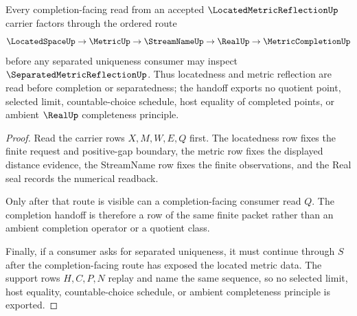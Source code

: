 \begin{theorem}
\label{thm:located-metric-reflection-completion-handoff}
Every completion-facing read from an accepted $\LocatedMetricReflectionUp$ carrier factors through the ordered route
$$
\LocatedSpaceUp \to \MetricUp \to \StreamNameUp \to \RealUp \to \MetricCompletionUp
$$
before any separated uniqueness consumer may inspect $\SeparatedMetricReflectionUp$. Thus locatedness and metric reflection are read before completion or separatedness; the handoff exports no quotient point, selected limit, countable-choice schedule, host equality of completed points, or ambient $\RealUp$ completeness principle.
\end{theorem}
\begin{proof}
Read the carrier rows $X,M,W,E,Q$ first. The locatedness row fixes the finite request and positive-gap boundary, the metric row fixes the displayed distance evidence, the StreamName row fixes the finite observations, and the Real seal records the numerical readback.

Only after that route is visible can a completion-facing consumer read $Q$. The completion handoff is therefore a row of the same finite packet rather than an ambient completion operator or a quotient class.

Finally, if a consumer asks for separated uniqueness, it must continue through $S$ after the completion-facing route has exposed the located metric data. The support rows $H,C,P,N$ replay and name the same sequence, so no selected limit, host equality, countable-choice schedule, or ambient completeness principle is exported.
\end{proof}


\begin{closurestatus}{\LocatedMetricReflectionUp}
  \theoryclosure{\seedClosure}
  \formalstatus{\unformalizedV}
\end{closurestatus}
